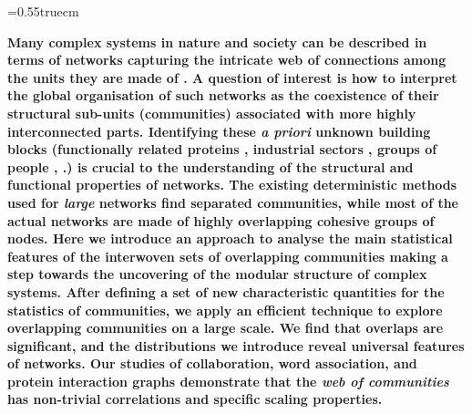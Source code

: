 \documentclass[11pt,a4paper]{article}
\begin{document}
\baselineskip=0.55truecm
\bigskip
\bigskip

\textbf{
Many complex systems in nature and society can be described in terms
of networks capturing the intricate web of connections among the units
they are made of
\cite{watts-strogatz,barabasi-albert,albert-revmod,dm-book}.
A question of interest is how to interpret
the global organisation of such networks as the coexistence of their
structural sub-units (communities) associated with
more highly interconnected parts.  Identifying these \textit{a priori}
unknown building blocks (functionally related  proteins
\cite{ravasz-science,spirin-pnas},
industrial sectors
\cite{onnela-taxonomy},
groups of people
\cite{scott-book,watts-dodds},
\etc.) is crucial to
the understanding of the structural and functional
properties of networks. The existing
deterministic methods used for \emph{large} networks find separated
communities, while most of the actual networks are made of highly
overlapping cohesive groups of nodes. Here we introduce an approach to
analyse the main statistical features of the interwoven
sets of overlapping communities 
making a step towards the uncovering
of the modular structure of complex systems.
After defining
a set of new characteristic quantities for the statistics of communities,
we
apply an efficient technique to explore overlapping communities on a
large scale. We find that overlaps are significant, and
the distributions we introduce reveal universal
features of networks. Our studies of collaboration, word association,
and protein interaction graphs demonstrate that the \emph{web of
communities} has non-trivial correlations and specific scaling
properties.
}
\end{document}
